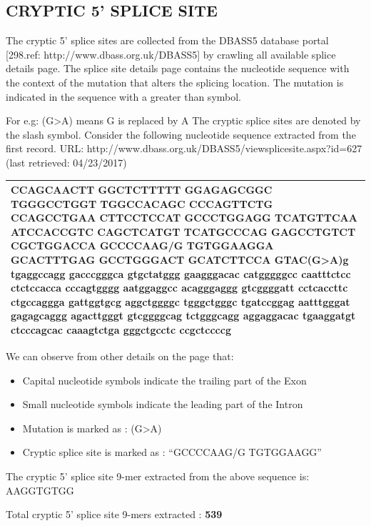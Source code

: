 \documentclass[12pt,a4paper]{article}
\begin{document}
	\subsection{CRYPTIC 5' SPLICE SITE}
	
	The cryptic 5’ splice sites are collected from the DBASS5 database portal [298.ref: http://www.dbass.org.uk/DBASS5] by crawling all available splice details page. The splice site details page contains the nucleotide sequence with the context of the mutation that alters the splicing location. The mutation is indicated in the sequence with a greater than symbol. \par
	For e.g: (G>A) means G is replaced by A \newline
	The cryptic splice sites are denoted by the slash symbol. \newline
	Consider the following nucleotide sequence extracted from the first record.\newline
	URL: http://www.dbass.org.uk/DBASS5/viewsplicesite.aspx?id=627 (last retrieved: 04/23/2017)

		
	\begin{tabular}{ | p{\linewidth} |}
		\hline
		CCAGCAACTT GGCTCTTTTT GGAGAGCGGC TGGGCCTGGT TGGCCACAGC CCCAGTTCTG CCAGCCTGAA CTTCCTCCAT GCCCTGGAGG TCATGTTCAA ATCCACCGTC CAGCTCATGT TCATGCCCAG GAGCCTGTCT CGCTGGACCA GCCCCAA\textbf{G/G} TGTGGAAGGA GCACTTTGAG GCCTGGGACT GCATCTTCCA GTAC\textbf{(G>A)}g tgaggccagg gacccgggca gtgctatggg gaagggacac catgggggcc caatttctcc ctctccacca cccagtgggg aatggaggcc acagggaggg gtcggggatt cctcaccttc ctgccaggga gattggtgcg aggctggggc tgggctgggc tgatccggag aatttgggat gagagcaggg agacttgggt gtcggggcag tctgggcagg aggaggacac tgaaggatgt ctcccagcac caaagtctga gggctgcctc ccgctccccg \\
		\hline
	\end{tabular}
	
	We can observe from other details on the page that:
	\begin{itemize}
		\item Capital nucleotide symbols indicate the trailing part of the Exon
		\item Small nucleotide symbols indicate the leading part of the Intron
		\item Mutation is marked as : (G>A)
		\item Cryptic splice site is marked as : “GCCCCAAG/G TGTGGAAGG”
	\end{itemize}
	The cryptic 5’ splice site 9-mer extracted from the above sequence is: AAGGTGTGG \par
	Total cryptic 5’ splice site 9-mers extracted : \textbf{539}
\end{document}
